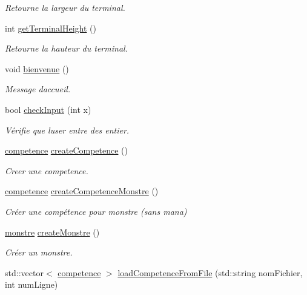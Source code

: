 \begin{DoxyCompactItemize}
\begin{DoxyCompactList}\small\item\em Retourne la largeur du terminal. \end{DoxyCompactList}\item 
int \hyperlink{namespaceio_ab7da8a98a7b636d1d5f0f6eb820f1f81}{get\+Terminal\+Height} ()
\begin{DoxyCompactList}\small\item\em Retourne la hauteur du terminal. \end{DoxyCompactList}\item 
void \hyperlink{namespaceio_a7fdf85a0d766d2dcdb9870ae0458826a}{bienvenue} ()
\begin{DoxyCompactList}\small\item\em Message d\textquotesingle{}accueil. \end{DoxyCompactList}\item 
bool \hyperlink{namespaceio_ac79ddb3191a9d00d007eb48deb315942}{check\+Input} (int x)
\begin{DoxyCompactList}\small\item\em Vérifie que l\textquotesingle{}user entre des entier. \end{DoxyCompactList}\item 
\hyperlink{classcompetence}{competence} \hyperlink{namespaceio_a474f817675f4aa2e28f1dac572046eb5}{create\+Competence} ()
\begin{DoxyCompactList}\small\item\em Creer une competence. \end{DoxyCompactList}\item 
\hyperlink{classcompetence}{competence} \hyperlink{namespaceio_a15bb99405bc68580d0d386d639a3a23c}{create\+Competence\+Monstre} ()
\begin{DoxyCompactList}\small\item\em Créer une compétence pour monstre (sans mana) \end{DoxyCompactList}\item 
\hyperlink{classmonstre}{monstre} \hyperlink{namespaceio_ad3711fbbc414b4d27c255ad8347d3ca2}{create\+Monstre} ()
\begin{DoxyCompactList}\small\item\em Créer un monstre. \end{DoxyCompactList}\item 
std\+::vector$<$ \hyperlink{classcompetence}{competence} $>$ \hyperlink{namespaceio_a9297653474b9ce9930d6a3862401e751}{load\+Competence\+From\+File} (std\+::string nom\+Fichier, int num\+Ligne)

\end{DoxyCompactItemize}
